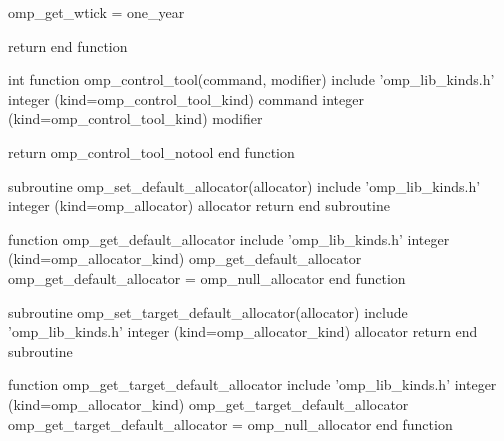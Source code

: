 {\begin{codepar}
  omp\_get\_wtick = one\_year

  return
end function

int function omp\_control\_tool(command, modifier)
  include 'omp\_lib\_kinds.h'
  integer (kind=omp\_control\_tool\_kind) command
  integer (kind=omp\_control\_tool\_kind) modifier

  return omp\_control\_tool\_notool
end function

subroutine omp\_set\_default\_allocator(allocator)
  include 'omp\_lib\_kinds.h'
  integer (kind=omp\_allocator\kind) allocator
  return
end subroutine

function omp\_get\_default\_allocator
  include 'omp\_lib\_kinds.h'
  integer (kind=omp\_allocator\_kind) omp\_get\_default\_allocator
  omp\_get\_default\_allocator = omp\_null\_allocator
end function

subroutine omp\_set\_target\_default\_allocator(allocator)
  include 'omp\_lib\_kinds.h'
  integer (kind=omp\_allocator\_kind) allocator
  return
end subroutine

function omp\_get\_target\_default\_allocator
  include 'omp\_lib\_kinds.h'
  integer (kind=omp\_allocator\_kind) omp\_get\_target\_default\_allocator
  omp\_get\_target\_default\_allocator = omp\_null\_allocator
end function


\end{codepar}} %

